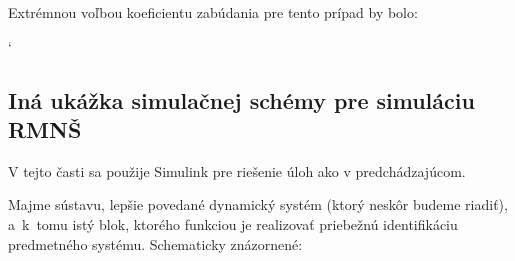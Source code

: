 \documentclass[a4paper, 10pt, ]{article}
\begin{document}
\noindent
Extrémnou voľbou koeficientu zabúdania pre tento prípad by bolo:


{\catcode`

}



\begin{centering}


    \vspace{-2mm}

    \figcaption{}

    \vspace{2mm}

    \label{figsc_ar03_fig03_2}

\end{centering}




























\subsection{Iná ukážka simulačnej schémy pre simuláciu RMNŠ}

V tejto časti sa použije Simulink pre riešenie úloh ako v predchádzajúcom.

\medskip

\noindent
Majme sústavu, lepšie povedané dynamický systém (ktorý neskôr budeme riadiť), a~k~tomu istý blok, ktorého funkciou je realizovať priebežnú identifikáciu predmetného systému. Schematicky znázornené:


\begin{centering}


    \vspace{-2mm}

    \figcaption{}

    \vspace{2mm}

    \label{sim_RMNS}

\end{centering}
\end{document}
